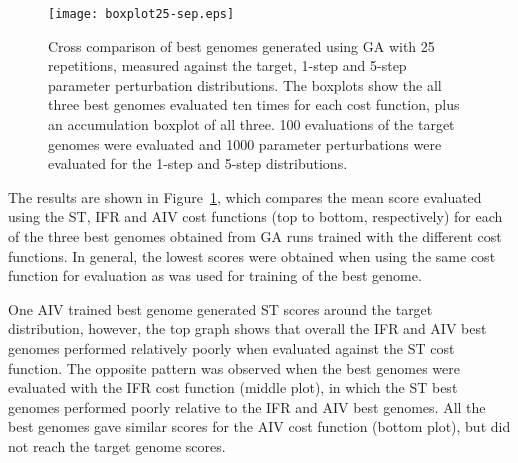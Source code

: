 \begin{figure}[th!]
  \centering
  \texttt{[image: boxplot25-sep.eps]}\\
  \caption{Cross comparison of best genomes generated using GA with 25
    repetitions, measured against the target, 1-step and 5-step
    parameter perturbation distributions.  The boxplots show the all
    three best genomes evaluated ten times for each cost function,
    plus an accumulation boxplot of all three. 100 evaluations of the
    target genomes were evaluated and 1000 parameter perturbations
    were evaluated for the 1-step and 5-step
    distributions.}\label{fig:GA:R2A}
\end{figure}

\smallskip{}

The results are shown in Figure~\ref{fig:GA:R2A}, which compares the mean
score evaluated using the ST, IFR and AIV cost functions (top to
bottom, respectively) for each of the three best genomes obtained from
GA runs trained with the different cost functions. In general, the
lowest scores were obtained when using the same cost function for
evaluation as was used for training of the best genome.

\smallskip{}

One AIV trained best genome generated ST scores around the target distribution,
however, the top graph shows that overall the IFR and AIV best genomes performed
relatively poorly when evaluated against the ST cost function.  The opposite
pattern was observed when the best genomes were evaluated with the IFR cost
function (middle plot), in which the ST best genomes performed poorly relative
to the IFR and AIV best genomes. All the best genomes gave similar scores for
the AIV cost function (bottom plot), but did not reach the target genome scores.


